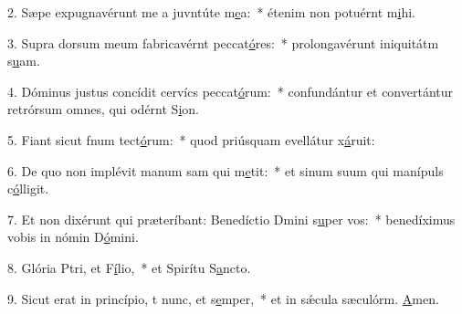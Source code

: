 2. Sæpe expugnavérunt me a juvntúte m\uline{e}a:~* étenim non potuérnt m\uline{i}hi.\par 
3. Supra dorsum meum fabricavérnt peccat\uline{ó}res:~* prolongavérunt iniquitátm s\uline{u}am.\par 
4. Dóminus justus concídit cervícs peccat\uline{ó}rum:~* confundántur et convertántur retrórsum omnes, qui odérnt S\uline{i}on.\par 
5. Fiant sicut fnum tect\uline{ó}rum:~* quod priúsquam evellátur x\uline{á}ruit:\par 
6. De quo non implévit manum sam qui m\uline{e}tit:~* et sinum suum qui manípuls c\uline{ó}lligit.\par 
7. Et non dixérunt qui præteríbant: Benedíctio Dmini s\uline{u}per vos:~* benedíximus vobis in nómin D\uline{ó}mini.\par 
8. Glória Ptri, et F\uline{í}lio,~* et Spirítu S\uline{a}ncto.\par 
9. Sicut erat in princípio, t nunc, et s\uline{e}mper,~* et in sǽcula sæculórm. \uline{A}men.\par 
